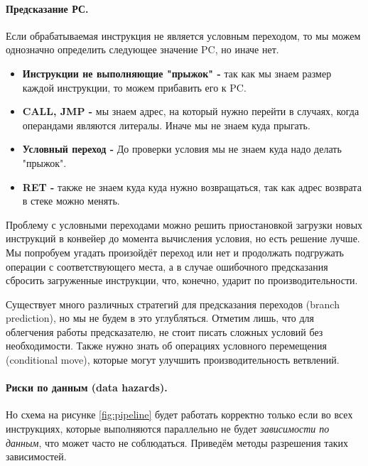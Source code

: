 \documentclass[12pt,a4paper]{article}
\begin{document}
\paragraph{Предсказание РС.}
\indent

Если обрабатываемая инструкция не является условным переходом, то мы можем однозначно определить следующее значение PC, но иначе нет.

\begin{itemize}
    \item \textbf{Инструкции не выполняющие "прыжок" - } так как мы знаем размер каждой инструкции, то можем прибавить его к PC.
    \item \textbf{CALL, JMP - } мы знаем адрес, на который нужно перейти в случаях, когда операндами являются литералы. Иначе мы не знаем куда прыгать.
    \item \textbf{Условный переход - } До проверки условия мы не знаем куда надо делать "прыжок".
    \item \textbf{RET - } также не знаем куда куда нужно возвращаться, так как адрес возврата в стеке можно менять.
\end{itemize}

Проблему с условными переходами можно решить приостановкой загрузки новых инструкций в конвейер до момента вычисления условия, но есть решение лучше. Мы попробуем угадать произойдёт переход или нет и продолжать подгружать операции с соответствующего места, а в случае ошибочного предсказания сбросить загруженные инструкции, что, конечно, ударит по производительности.

Существует много различных стратегий для предсказания переходов (branch prediction), но мы не будем в это углубляться. Отметим лишь, что для облегчения работы предсказателю, не стоит писать сложных условий без необходимости. Также нужно знать об операциях условного перемещения (conditional move), которые могут улучшить производительность ветвлений.

\paragraph{Риски по данным (data hazards).}
\indent 

Но схема на рисунке \ref{fig:pipeline} будет работать корректно только если во всех инструкциях, которые выполняются параллельно не будет \textit{зависимости по данным}, что может часто не соблюдаться. Приведём методы разрешения таких зависимостей.
\end{document}
